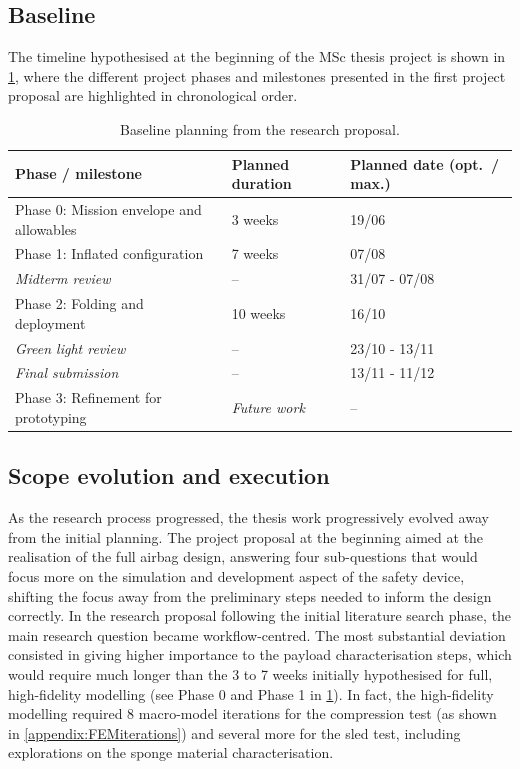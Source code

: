 \subsection{Baseline}
The timeline hypothesised at the beginning of the MSc thesis project is shown in \cref{tab:pm-baseline}, where the different project phases and milestones presented in the first project proposal are highlighted in chronological order.
\begin{table}[htbp]
    \centering
    \caption{Baseline planning from the research proposal.}
    \label{tab:pm-baseline}
    \small
    \begin{tabularx}{\textwidth}{@{}X l l@{}}
        \toprule
        \textbf{Phase / milestone} & \textbf{Planned duration} & \textbf{Planned date (opt.\ / max.)} \\
        \midrule
        Phase 0: Mission envelope and allowables & 3 weeks  & 19/06 \\
        Phase 1: Inflated configuration          & 7 weeks  & 07/08 \\
        \midrule
        \textit{Midterm review}                           & --       & 31/07 - 07/08 \\
        \midrule
        Phase 2: Folding and deployment          & 10 weeks & 16/10 \\
        \midrule
        \textit{Green light review}                      & --       & 23/10 - 13/11 \\
        \textit{Final submission}                         & --       & 13/11 - 11/12 \\
        \midrule
        Phase 3: Refinement for prototyping      & \textit{Future work}      & -- \\        
        \bottomrule
    \end{tabularx}
\end{table}
 
\subsection{Scope evolution and execution}
As the research process progressed, the thesis work progressively evolved away from the initial planning. The project proposal at the beginning aimed at the realisation of the full airbag design, answering four sub-questions that would focus more on the simulation and development aspect of the safety device, shifting the focus away from the preliminary steps needed to inform the design correctly. In the research proposal following the initial literature search phase, the main research question became workflow-centred. The most substantial deviation consisted in giving higher importance to the payload characterisation steps, which would require much longer than the 3 to 7 weeks initially hypothesised for full, high-fidelity modelling (see Phase 0 and Phase 1 in \cref{tab:pm-baseline}). In fact, the high-fidelity modelling required 8 macro-model iterations for the compression test (as shown in \cref{appendix:FEMiterations}) and several more for the sled test, including explorations on the sponge material characterisation.

